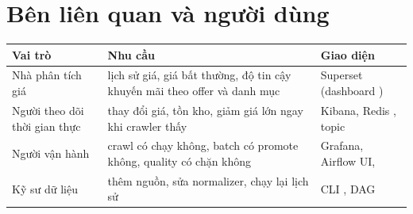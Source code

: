 \section{Bên liên quan và người dùng}
\begin{xltabular}{\linewidth}{@{}L{38mm}Y L{40mm}@{}}
  \toprule
  \textbf{Vai trò} & \textbf{Nhu cầu} & \textbf{Giao diện} \\
  \midrule
  Nhà phân tích giá & lịch sử giá, giá bất thường, độ tin cậy khuyến mãi theo offer và danh mục & Superset (dashboard ) \\
  Người theo dõi thời gian thực & thay đổi giá, tồn kho, giảm giá lớn ngay khi crawler thấy & Kibana, Redis , topic  \\
  Người vận hành & crawl có chạy không, batch có promote không, quality có chặn không & Grafana, Airflow UI,  \\
  Kỹ sư dữ liệu & thêm nguồn, sửa normalizer, chạy lại lịch sử & CLI , DAG  \\
  \bottomrule
\end{xltabular}

